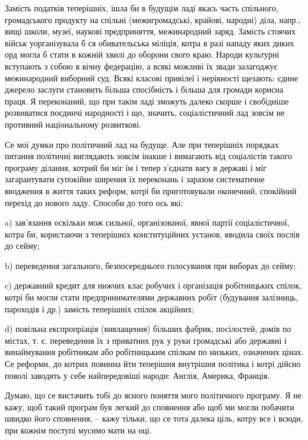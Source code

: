 Замість податків теперішніх, ішла би в будущім ладі якась часть спільного,
громадського продукту на спільні (межигромадські, крайові, народні) діла,
напр., вищі школи, музеї, наукові предприняття, межинародний заряд. Замість
стоячих військ уорганізувала б ся обивательська міліція, котра в разі нападу
яких диких орд могла б стати в кожній хвилі до оборони свого краю. Народи
культурні вступають з собою в вічну федерацію, а всякі можливі їх звади
залагоджує межинародний виборний суд. Всякі класові привілеї і нерівності
щезають: єдине джерело заслуги становить більша спосібність і більша для
громади корисна праця. Я переконаний, що при такім ладі зможуть далеко скорше і
свобідніше розвиватися поєдинчі народності і що, значить, соціалістичний лад
зовсім не противний національному розвиткові.

Се мої думки про політичний лад на будуще. Але при теперішніх порядках питання
політичні виглядають зовсім інакше і вимагають від соціалістів такого програму
ділання, котрий би міг їм і тепер з’єднати вагу в державі і міг загарантувати
супокійне ширення їх переконань і заразом систематичне вводження в життя таких
реформ, котрі би приготовували оконечний, спокійний перехід до нового ладу.
Способи до того ось які:

a) зав’язання оскільки мож сильної, організованої, явної партії соціалістичної, котра би, користаючи з теперішніх конституційних установ, вводила своїх послів до сейму;

b) переведення загального, безпосереднього голосування при виборах до сейму;

c) державний кредит для нижчих клас робучих і організація робітницьких спілок,
котрі би могли стати предпринимателями державних робіт (будування залізниць,
пароходів і др.) замість теперішніх спілок акційних;

d) повільна експропріація (вивлащення) більших фабрик, посілостей, домів по
містах, т. є. переведення їх з приватних рук у руки громадські або державні і
винаймування робітникам або робітницьким спілкам по низьких, означених цінах.
Се реформи, до котрих повинна йти теперішня внутрішня політика і котрі дійсно
поволі заводять у себе найпередовіші народи: Англія, Америка, Франція.

Думаю, що се вистачить тобі до ясного поняття мого політичного програму. Я не
кажу, щоб такий програм був легкий до сповнення або щоб ми могли побачити
швидко його сповнення, – кажу тільки, що се тота далека ціль, котру все і
всюди, при кожнім поступі мусимо мати на оці.

